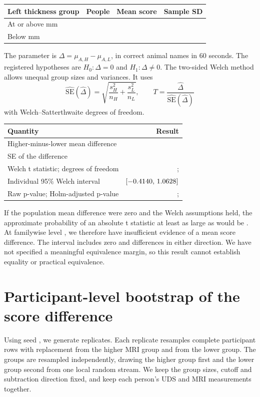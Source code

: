 \documentclass[11pt]{article}
\newcommand{\ci}[2]{\ensuremath{[#1,\,#2]}}
\begin{document}
\begin{center}\small
\begin{tabular}{@{}lrrr@{}}
\toprule
Left thickness group & People & Mean score & Sample SD \\
\midrule
At or above \ThicknessCut{} mm & \HigherN{} & \HigherScoreMean{} & \HigherScoreSD{} \\
Below \ThicknessCut{} mm & \LowerN{} & \LowerScoreMean{} & \LowerScoreSD{} \\
\bottomrule
\end{tabular}
\end{center}

The parameter is $\Delta=\mu_{A,H}-\mu_{A,L}$, in correct animal names
in 60 seconds. The registered hypotheses are $H_0:\Delta=0$ and
$H_1:\Delta\ne0$. The two-sided Welch method allows unequal group
sizes and variances. It uses
\[
\widehat{\mathrm{SE}}(\widehat\Delta)
=\sqrt{\frac{s_H^2}{n_H}+\frac{s_L^2}{n_L}},\qquad
T=\frac{\widehat\Delta}{\widehat{\mathrm{SE}}(\widehat\Delta)}
\]
with Welch--Satterthwaite degrees of freedom.

\begin{center}\small
\begin{tabular}{@{}lr@{}}
\toprule
Quantity & Result \\
\midrule
Higher-minus-lower mean difference & \DeltaEstimate{} \\
SE of the difference & \DeltaSE{} \\
Welch t statistic; degrees of freedom & \DeltaT{}; \DeltaDF{} \\
Individual 95\% Welch interval & \ci{\DeltaLow}{\DeltaHigh} \\
Raw p-value; Holm-adjusted p-value & \DeltaRawP{}; \DeltaHolmP{} \\
\bottomrule
\end{tabular}
\end{center}

If the population mean difference were zero and the Welch assumptions
held, the approximate probability of an absolute t statistic at least
as large as \DeltaT{} would be \DeltaRawP{}. At familywise level
\TestAlpha{}, we therefore have insufficient evidence of a mean score
difference. The interval includes zero and differences in either
direction. We have not specified a meaningful equivalence margin, so
this result cannot establish equality or practical equivalence.

\clearpage
\section{Participant-level bootstrap of the score difference}
Using seed \ContrastSeed{}, we generate \Replicates{} replicates. Each
replicate resamples \HigherN{} complete participant rows with replacement from the
higher MRI group and \LowerN{} from the lower group. The groups are
resampled independently, drawing the higher group first and the lower
group second from one local random stream. We keep the group sizes,
cutoff and subtraction direction fixed, and keep each person's UDS and
MRI measurements together.
\end{document}

